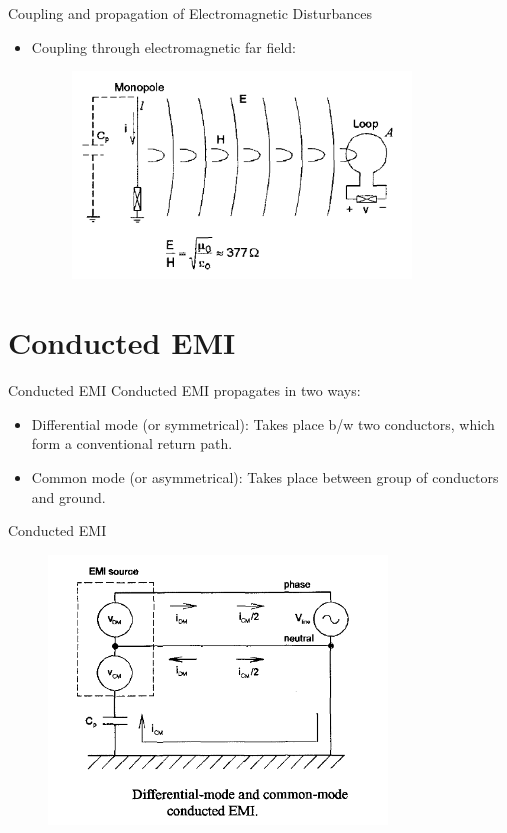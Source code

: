 \documentclass{beamer}
\begin{document}
\begin{frame}{Coupling and propagation of Electromagnetic Disturbances}
\begin{itemize}
\item Coupling through electromagnetic far field:
	\begin{figure}[ht!]
	\includegraphics[width=90mm]{FIG_4.png}
	\end{figure}
\end{itemize}
\end{frame}

\section{Conducted EMI} 
\begin{frame}{Conducted EMI}
Conducted EMI propagates in two ways:
\begin{itemize}
\item Differential mode (or symmetrical): Takes place b/w two conductors, which form a conventional return path. 
\item Common mode (or asymmetrical): Takes place between group of conductors and ground.	
\end{itemize}
\end{frame}

\begin{frame}{Conducted EMI}
	\begin{figure}[ht!]
	\includegraphics[width=90mm]{FIG_5.png}
	\end{figure}
\end{frame}
\end{document}
